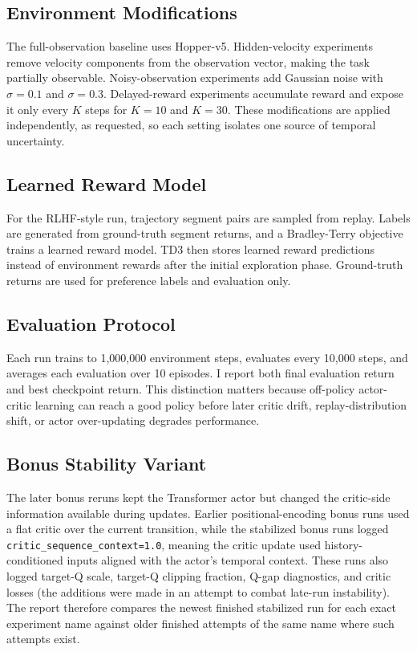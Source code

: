 \documentclass[11pt]{article}
\begin{document}
\subsection{Environment Modifications}

The full-observation baseline uses Hopper-v5. Hidden-velocity experiments remove velocity components from the observation vector, making the task partially observable. Noisy-observation experiments add Gaussian noise with $\sigma=0.1$ and $\sigma=0.3$. Delayed-reward experiments accumulate reward and expose it only every $K$ steps for $K=10$ and $K=30$. These modifications are applied independently, as requested, so each setting isolates one source of temporal uncertainty.

\subsection{Learned Reward Model}

For the RLHF-style run, trajectory segment pairs are sampled from replay. Labels are generated from ground-truth segment returns, and a Bradley-Terry objective trains a learned reward model. TD3 then stores learned reward predictions instead of environment rewards after the initial exploration phase. Ground-truth returns are used for preference labels and evaluation only.

\subsection{Evaluation Protocol}

Each run trains to 1,000,000 environment steps, evaluates every 10,000 steps, and averages each evaluation over 10 episodes. I report both final evaluation return and best checkpoint return. This distinction matters because off-policy actor-critic learning can reach a good policy before later critic drift, replay-distribution shift, or actor over-updating degrades performance.

\subsection{Bonus Stability Variant}

The later bonus reruns kept the Transformer actor but changed the critic-side information available during updates. Earlier positional-encoding bonus runs used a flat critic over the current transition, while the stabilized bonus runs logged \texttt{critic\_sequence\_context=1.0}, meaning the critic update used history-conditioned inputs aligned with the actor's temporal context. These runs also logged target-Q scale, target-Q clipping fraction, Q-gap diagnostics, and critic losses (the additions were made in an attempt to combat late-run instability). The report therefore compares the newest finished stabilized run for each exact experiment name against older finished attempts of the same name where such attempts exist.
\end{document}

